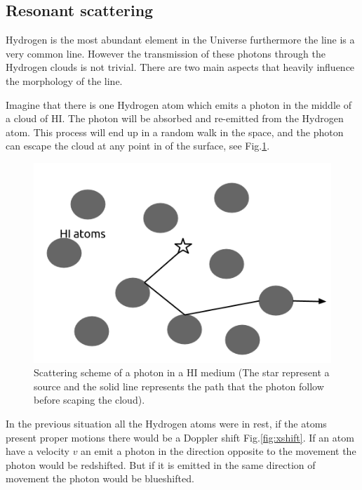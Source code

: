 \subsection{Resonant scattering}\label{sec:resonant}

Hydrogen is the most abundant element in the Universe furthermore
the \ly line is a very common line. However the transmission of these
\ly  photons through the Hydrogen clouds is not trivial. There 
are two main aspects that heavily influence the morphology of the line.

Imagine that there is one Hydrogen atom which emits 
a \ly photon in the middle of a cloud of HI. 
The \ly photon will be absorbed and re-emitted from 
the Hydrogen atom. This process will end up in a random walk in the space,
and the photon can escape the cloud at any point in of the surface, see 
Fig.\ref{fig:rw}.\\

\begin{figure}
\begin{center}
\includegraphics[scale=0.4]{../Figures/randomwalk.png}
\end{center}\caption{Scattering scheme of a \ly photon in a HI medium
(The star represent a \ly source and the solid line represents the path that
the \ly photon follow before scaping the cloud).\label{fig:rw}}
\end{figure}


In the previous situation all the Hydrogen atoms were in rest, if the atoms
present proper motions there would be a Doppler shift Fig.\ref{fig:xshift}. 
If an atom have a velocity $v$ an emit a \ly photon in the direction 
opposite to the movement the \ly photon 
would be redshifted. But if it is emitted in the same direction of movement the
\ly photon would be blueshifted.    

